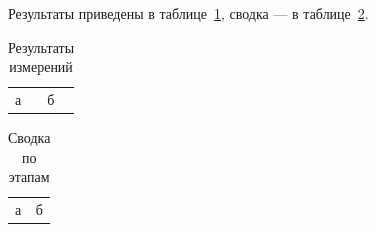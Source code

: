 Результаты приведены в таблице~\ref{tab:results}, сводка — в
таблице~\ref{tab:summary}.

\begin{table}
  \caption{Результаты измерений}
  \label{tab:results}
  \begin{tabular}{ll}
    а & б \\
  \end{tabular}
\end{table}

\begin{table}
  \caption{Сводка по этапам}
  \label{tab:summary}
  \begin{tabular}{ll}
    а & б \\
  \end{tabular}
\end{table}
